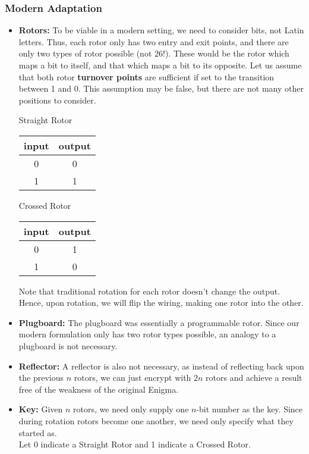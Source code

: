 \documentclass{article}
\begin{document}
\subsubsection{Modern Adaptation}
\begin{itemize}
\item \textbf{Rotors:} To be viable in a modern setting, we need to
  consider bits, not Latin letters. Thus, each rotor only has two entry
  and exit points, and
  there are only two types of rotor possible (not $26!$). These would be
  the rotor which maps a bit to itself, and that which maps a bit to
  its opposite. Let us assume that both rotor \textbf{turnover points} are
  sufficient if set to the transition between 1 and 0. This assumption may
  be false, but there are not many other positions to consider.
  \begin{center}
    Straight Rotor\\
    \begin{tabular}{c | c}
      input & output\\
      \hline
      0 & 0\\
      1 & 1
    \end{tabular}
  \end{center}
    \begin{center}
    Crossed Rotor\\
    \begin{tabular}{c | c}
      input & output\\
      \hline
      0 & 1\\
      1 & 0
    \end{tabular}
  \end{center}
    Note that traditional rotation for each rotor doesn't change the output.
    Hence, upon rotation, we will flip the wiring, making one rotor
    into the other.

\item \textbf{Plugboard:} The plugboard was essentially a programmable rotor.
 Since our modern formulation only has two rotor types possible, an analogy
 to a plugboard is not necessary.
\item \textbf{Reflector:} A reflector is also not necessary, as instead
  of reflecting back upon the previous $n$ rotors, we can just encrypt with
  $2n$ rotors and achieve a result free of the weakness of the original
  Enigma.
\item \textbf{Key:} Given $n$ rotors, we need only supply one $n$-bit
  number as the key. Since during rotation rotors become one another,
  we need only specify what they started as.\\
  Let $0$ indicate a Straight Rotor and 1 indicate a Crossed Rotor.

\end{itemize}
\end{document}
